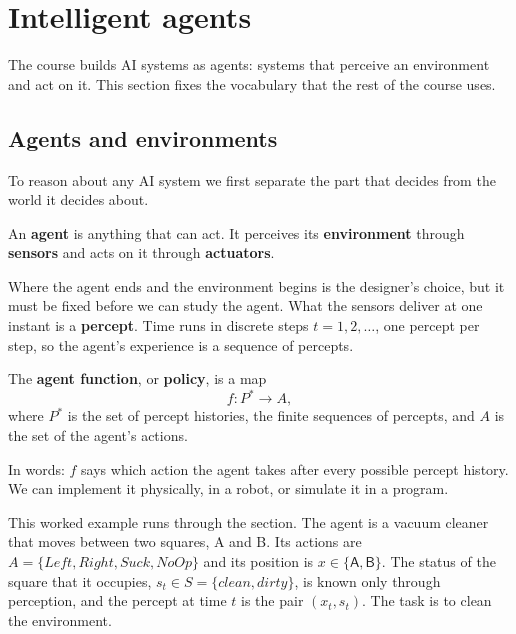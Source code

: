 \section{Intelligent agents}\label{sec:agents}

The course builds AI systems as agents: systems that perceive an environment and
act on it. This section fixes the vocabulary that the rest of the course
uses.

\subsection{Agents and environments}\label{sec:agents-env}

To reason about any AI system we first separate the part that decides from the
world it decides about.

\begin{definition}[Agent]\label{def:agent}
  An \textbf{agent} is anything that can act. It perceives its
  \textbf{environment} through \textbf{sensors} and acts on it through
  \textbf{actuators}.
\end{definition}

Where the agent ends and the environment begins is the designer's choice, but
it must be fixed before we can study the agent. What the sensors deliver at one
instant is a \textbf{percept}. Time runs in discrete steps $t = 1, 2, \dots$,
one percept per step, so the agent's experience is a sequence of percepts.

\begin{definition}\label{def:agent-function}
  The \textbf{agent function}, or \textbf{policy}, is a map
  \[
    f \colon P^* \to A,
  \]
  where $P^*$ is the set of percept histories, the finite sequences of
  percepts, and $A$ is the set of the agent's actions.
\end{definition}

In words: $f$ says which action the agent takes after every possible percept
history. We can implement it physically, in a robot, or simulate it in a
program.

\begin{example}\label{ex:vacuum-world}
  This worked example runs through the section. The agent is a vacuum cleaner
  that moves between two squares, \textsf{A} and \textsf{B}.
  Its actions are $A = \{\mathit{Left}, \mathit{Right}, \mathit{Suck},
  \mathit{NoOp}\}$ and its position is $x \in \{\textsf{A}, \textsf{B}\}$.
  The status of the square that it occupies,
  $s_t \in S = \{\mathit{clean}, \mathit{dirty}\}$, is known only through
  perception, and the percept at time $t$ is the pair $(x_t, s_t)$. The task
  is to clean the environment.
\end{example}


